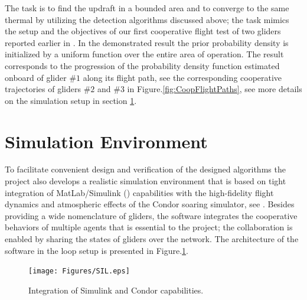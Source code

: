 \documentclass{ifacconf}
\newcommand{\squeezeup}{\vspace{-2.0mm}}
\begin{document}
The task is to find the updraft in a bounded area and to converge to the same
thermal by utilizing the detection algorithms discussed above; the task
mimics the setup and the objectives of our first cooperative flight test of
two gliders reported earlier in \cite{AKlass_JGCD:2012}. In the demonstrated
result the prior probability density is initialized by a uniform function
over the entire area of operation. The result corresponds to the progression
of the probability density function estimated onboard of glider $\#1$ along
its flight path, see the corresponding cooperative trajectories of gliders
$\#2$ and $\#3$ in Figure.\ref{fig:CoopFlightPaths}, see more details on the
simulation setup in section \ref{sec:SimEnv}.

\section{Simulation Environment}
\label{sec:SimEnv}
\squeezeup

To facilitate convenient design and verification of the designed algorithms
the project also develops a realistic simulation environment that is based on
tight integration of MatLab/Simulink (\cite{MATLAB:2013}) capabilities with
the high-fidelity flight dynamics and atmospheric effects of the Condor
soaring simulator, see \cite{Condor:2013:Online}. Besides providing a wide
nomenclature of gliders, the software integrates the cooperative behaviors of
multiple agents that is essential to the project; the collaboration is
enabled by sharing the states of gliders over the network. The architecture
of the software in the loop setup is presented in Figure.\ref{fig:SIL}.
%

\begin{figure}[thpb]
  \centering
  \texttt{[image: Figures/SIL.eps]}
  \caption{Integration of Simulink and Condor capabilities.}
  \label{fig:SIL}
\end{figure}
\end{document}
